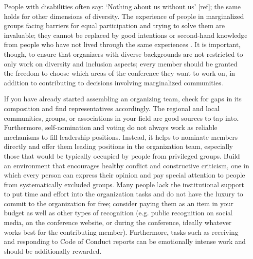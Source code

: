 \documentclass[10pt,letterpaper]{article}
\begin{document}
People with disabilities often say: `Nothing about us without us' [ref]; the same holds for other dimensions of diversity. The experience of people in marginalized groups facing barriers for equal participation and trying to solve them are invaluable; they cannot be replaced by good intentions or second-hand knowledge from people who have not lived through the same experiences \cite{costanzachockDesign2020}.
It is important, though, to ensure that organizers with diverse backgrounds are not restricted to only work on diversity and inclusion aspects; 
every member should be granted the freedom to choose which areas of the conference they want to work on, in addition to contributing to decisions involving marginalized communities. 


If you have already started assembling an organizing team, check for gaps in its composition and find representatives accordingly. 
The regional and local communities, groups, or associations in your field are good sources to tap into. 
Furthermore, self-nomination and voting do not always work as reliable mechanisms to fill leadership positions. Instead, it helps to nominate members directly and offer them leading positions in the organization team, especially those that would be typically occupied by people from privileged groups.
Build an environment that encourages healthy conflict and constructive criticism, one in which every person can express their opinion and pay special attention to people from systematically excluded groups.
Many people lack the institutional support to put time and effort into the organization tasks and do not have the luxury to commit to the organization for free; consider paying them as an item in your budget as well as other types of recognition (e.g. public recognition on social media, on the conference website, or during the conference, ideally whatever works best for the contributing member).
Furthermore, tasks such as receiving and responding to Code of Conduct reports can be emotionally intense work and should be additionally rewarded.

\end{document}
